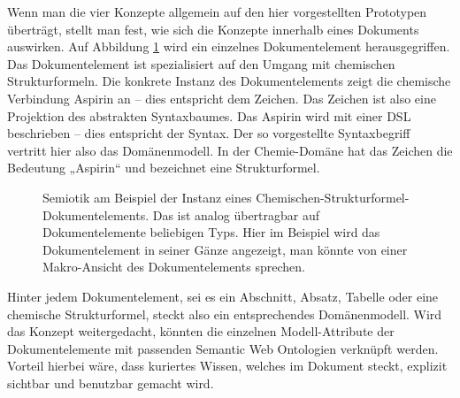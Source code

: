  
Wenn man die vier Konzepte allgemein auf den hier vorgestellten Prototypen überträgt, stellt man fest, wie sich die Konzepte innerhalb eines Dokuments auswirken. Auf Abbildung \ref{semiotikmakro} wird ein einzelnes Dokumentelement herausgegriffen. Das Dokumentelement ist spezialisiert auf den Umgang mit chemischen Strukturformeln. Die konkrete Instanz des Dokumentelements zeigt die chemische Verbindung Aspirin an -- dies entspricht dem Zeichen. Das Zeichen ist also eine Projektion des abstrakten Syntaxbaumes. Das Aspirin wird mit einer DSL beschrieben -- dies entspricht der Syntax. Der so vorgestellte Syntaxbegriff vertritt hier also das Domänenmodell. In der Chemie-Domäne hat das Zeichen die Bedeutung „Aspirin“ und bezeichnet eine Strukturformel.

 
\begin{figure}[h!]
\centering
\advance\leftskip-2.5cm
\caption[Semiotik der Makro-Ansicht eines Dokumentelements]{ Semiotik am Beispiel der Instanz eines Chemischen-Strukturformel-Dokumentelements. Das ist analog übertragbar auf Dokumentelemente beliebigen Typs. Hier im Beispiel wird das Dokumentelement in seiner Gänze angezeigt, man könnte von einer Makro-Ansicht des Dokumentelements sprechen. }\label{semiotikmakro}
\end{figure}
 
Hinter jedem Dokumentelement, sei es ein Abschnitt, Absatz, Tabelle oder eine chemische Strukturformel, steckt also ein entsprechendes Domänenmodell. Wird das Konzept weitergedacht, könnten die einzelnen Modell-Attribute der Dokumentelemente mit passenden Semantic Web Ontologien verknüpft werden. Vorteil hierbei wäre, dass kuriertes Wissen, welches im Dokument steckt, explizit sichtbar und benutzbar gemacht wird.


